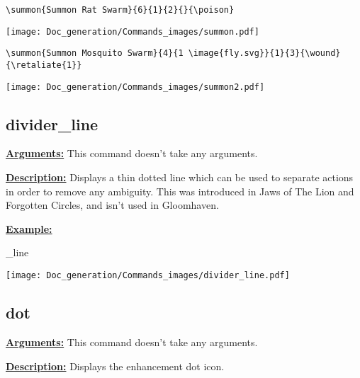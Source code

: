 \documentclass{article}
\begin{document}
\begin{center}
\begin{BVerbatim}
\summon{Summon Rat Swarm}{6}{1}{2}{}{\poison}
\end{BVerbatim}
\end{center}

\begin{center}
\texttt{[image: Doc\_generation/Commands\_images/summon.pdf]}
\end{center}

\begin{center}
\begin{BVerbatim}
\summon{Summon Mosquito Swarm}{4}{1 \image{fly.svg}}{1}{3}{\wound}{\retaliate{1}}
\end{BVerbatim}
\end{center}

\begin{center}
\texttt{[image: Doc\_generation/Commands\_images/summon2.pdf]}
\end{center}


\subsection{divider\_line}
\textbf{\underline{Arguments:}} This command doesn't take any arguments.

\textbf{\underline{Description:}} Displays a thin dotted line which can be used to separate actions in order to remove any ambiguity. This was introduced in Jaws of The Lion and Forgotten Circles, and isn't used in Gloomhaven.

\textbf{\underline{Example:}}

\begin{minipage}{0.45\linewidth}
\raggedright
\begin{spverbatim}
\divider_line
\end{spverbatim}
\end{minipage}
\begin{minipage}{0.45\linewidth}
\raggedleft
\texttt{[image: Doc\_generation/Commands\_images/divider\_line.pdf]}
\end{minipage}


\subsection{dot}
\textbf{\underline{Arguments:}} This command doesn't take any arguments.

\textbf{\underline{Description:}} Displays the enhancement dot icon.
\end{document}
